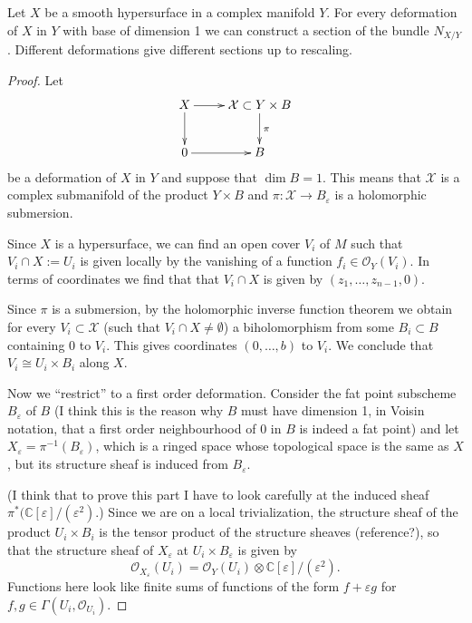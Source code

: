 \begin{proposition}
\label{proposition-kodaira-spencer-for-embedded-deformations}
Let $X$ be a smooth hypersurface in a complex manifold $Y$.
For every deformation of $X$ in $Y$ 
with base of dimension 1 we can construct a section of the bundle
$N_{X/Y}$. Different deformations give
different sections up to rescaling.
\end{proposition}

\begin{proof}
Let
$$
\xymatrix{
X\ar[r]\ar[d]
&\mathcal{X}\subset Y\times B\ar[d]^\pi\\
0\ar[r]
&B
}
$$
be a deformation of $X$ in $Y$
and suppose that $\dim B=1$.
This means that $\mathcal{X}$ is a complex submanifold of
the product $Y \times B$ 
and $\pi:\mathcal{X} \to B_\varepsilon$ is
a holomorphic submersion.

Since $X$ is a hypersurface,
we can find an open cover $V_i$ 
of $M$ such that $V_i \cap X:= U_i$ 
is given locally by the vanishing of
a function $f_i \in \mathcal{O}_Y(V_i)$.
In terms of coordinates we find that
that $V_i \cap X$ is given by $(z_1,…,z_{n-1},0)$.

Since $\pi$ is a submersion,
by the holomorphic inverse function theorem
we obtain for every $V_i \subset \mathcal{X}$ 
(such that $V_i \cap X \neq  \emptyset$)
a biholomorphism from some $B_i \subset B$ containing $0$ to $V_i$.
This gives coordinates $(0,…,b)$ to $V_i$.
We conclude that $V_i \cong U_i\times B_i$ along $X$.

Now we ``restrict'' to a first order deformation.
Consider the fat point subscheme
$B_\varepsilon$ of $B$ 
(I think this is the reason why $B$ must have dimension 1,
in Voisin notation, that a first order neighbourhood
of $0$ in $B$ is indeed a fat point)
and let $X_\varepsilon=\pi^{-1}(B_\varepsilon)$,
which is a ringed space whose topological space
is the same as $X$, but its
structure sheaf is induced from $B_\varepsilon$.

(I think that to prove this part I have
to look carefully at the induced sheaf
$\pi^*(\mathbb{C}[\varepsilon]/(\varepsilon^2)$.)
Since we are on a local trivialization,
the structure sheaf of the product $U_i \times B_i$ 
is the tensor product of the structure sheaves
(reference?),
so that the structure sheaf of $X_\varepsilon$ at
$U_i\times B_\varepsilon$ is given by
$$
\mathcal{O}_{X_\varepsilon}(U_i)=
 \mathcal{O}_Y(U_i) \otimes \mathbb{C}[\varepsilon]/(\varepsilon^2).
$$
Functions here look like finite sums of
functions of the form $f+ \varepsilon g$ for 
$f,g \in \Gamma(U_i,\mathcal{O}_{U_i})$.


\end{proof}
